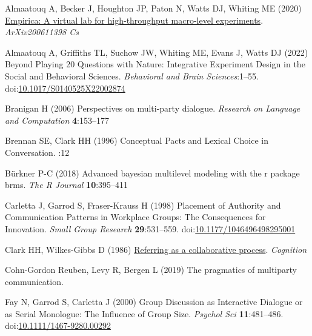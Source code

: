 \documentclass[
  english,
  a4paper,
]{article}
\newlength{\cslhangindent}
\newlength{\cslentryspacingunit} %
\newenvironment{CSLReferences}[2] %
 {%
  \setlength{\parindent}{0pt}
  \ifodd #1
  \let\oldpar\par
  \def\par{\hangindent=\cslhangindent\oldpar}
  \fi
  \setlength{\parskip}{#2\cslentryspacingunit}
 }%
 {}
\begin{document}
\setlength{\parindent}{-0.1in} 
\setlength{\leftskip}{0.125in}

\noindent

\hypertarget{refs}{}
\begin{CSLReferences}{1}{0}
\leavevmode{}%
Almaatouq A, Becker J, Houghton JP, Paton N, Watts DJ, Whiting ME (2020) \href{http://arxiv.org/abs/2006.11398}{Empirica: A virtual lab for high-throughput macro-level experiments}. \emph{ArXiv200611398 Cs}

\leavevmode{}%
Almaatouq A, Griffiths TL, Suchow JW, Whiting ME, Evans J, Watts DJ (2022) Beyond {Playing} 20 {Questions} with {Nature}: {Integrative Experiment Design} in the {Social} and {Behavioral Sciences}. \emph{Behavioral and Brain Sciences}:1--55. doi:\href{https://doi.org/10.1017/S0140525X22002874}{10.1017/S0140525X22002874}

\leavevmode{}%
Branigan H (2006) Perspectives on multi-party dialogue. \emph{Research on Language and Computation} \textbf{4}:153--177

\leavevmode{}%
Brennan SE, Clark HH (1996) Conceptual {Pacts} and {Lexical Choice} in {Conversation}. :12

\leavevmode{}%
Bürkner P-C (2018) Advanced bayesian multilevel modeling with the r package brms. \emph{The R Journal} \textbf{10}:395--411

\leavevmode{}%
Carletta J, Garrod S, Fraser-Krauss H (1998) Placement of {Authority} and {Communication Patterns} in {Workplace Groups}: {The Consequences} for {Innovation}. \emph{Small Group Research} \textbf{29}:531--559. doi:\href{https://doi.org/10.1177/1046496498295001}{10.1177/1046496498295001}

\leavevmode{}%
Clark HH, Wilkes-Gibbs D (1986) \href{http://www.speech.kth.se/~edlund/bielefeld/references/clark-and-wilkes-gibbs-1986.pdf}{Referring as a collaborative process}. \emph{Cognition}

\leavevmode{}%
Cohn-Gordon Reuben, Levy R, Bergen L (2019) The pragmatics of multiparty communication.

\leavevmode{}%
Fay N, Garrod S, Carletta J (2000) Group {Discussion} as {Interactive Dialogue} or as {Serial Monologue}: {The Influence} of {Group Size}. \emph{Psychol Sci} \textbf{11}:481--486. doi:\href{https://doi.org/10.1111/1467-9280.00292}{10.1111/1467-9280.00292}


\end{CSLReferences}
\end{document}

